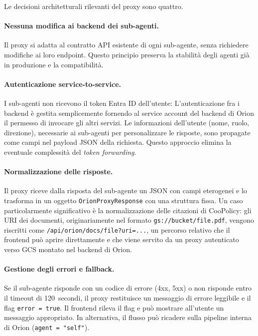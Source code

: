 Le decisioni architetturali rilevanti del proxy sono quattro.

\paragraph{Nessuna modifica ai backend dei sub-agenti.} Il proxy si adatta al contratto API esistente di ogni sub-agente, 
senza richiedere modifiche ai loro endpoint. Questo principio preserva la stabilità degli agenti già in produzione e la compatibilità.

\paragraph{Autenticazione service-to-service.} I sub-agenti non ricevono il token Entra ID dell'utente: 
L'autenticazione fra i backend è gestita semplicemente fornendo al service account del backend di Orion il permesso di invocare gli altri servizi.
Le informazioni dell'utente (nome, ruolo, direzione), necessarie ai sub-agenti per personalizzare le risposte, 
sono propagate come campi nel payload JSON della richiesta. 
Questo approccio elimina la eventuale complessità del \emph{token forwarding}.

\paragraph{Normalizzazione delle risposte.} Il proxy riceve dalla risposta del sub-agente un JSON 
con campi eterogenei e lo trasforma in un oggetto \texttt{OrionProxyResponse} con una struttura fissa. 
Un caso particolarmente significativo è la normalizzazione delle citazioni di CooPolicy: gli URI dei documenti, 
originariamente nel formato \texttt{gs://bucket/file.pdf}, vengono riscritti come \texttt{/api/orion/docs/file?uri=...}, 
un percorso relativo che il frontend può aprire direttamente e che viene servito da un proxy autenticato verso GCS montato nel backend di Orion.

\paragraph{Gestione degli errori e fallback.} Se il sub-agente risponde con un codice di errore (4xx, 5xx) 
o non risponde entro il timeout di 120~secondi, il proxy restituisce un messaggio di errore leggibile e il flag \texttt{error = true}. 
Il frontend rileva il flag e può mostrare all'utente un messaggio appropriato. In alternativa, 
il flusso può ricadere sulla pipeline interna di Orion (\texttt{agent = "self"}).


